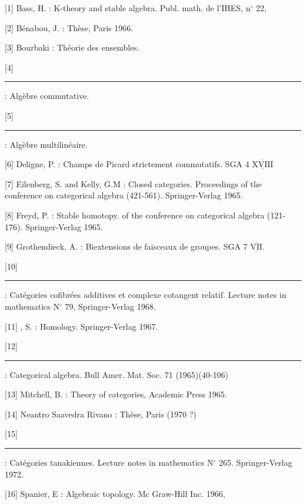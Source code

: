 [1] Bass, H. : K-theory and stable algebra. Publ. math. de l'IHES, n$^\circ$ 22,

[2] Bénabou, J. : Thèse, Paris 1966.

[3] Bourbaki : Théorie des ensembles.

[4] \rule[.25ex]{3em}{.45pt} : Algèbre commutative.

[5] \rule[.25ex]{3em}{.45pt} : Algèbre multilinéaire.

[6] Deligne, P. : Champs de Picard strictement commutatifs. SGA 4 $\overline{\underline{\mathrm{XVIII}}}$

[7] Eilenberg, S. and Kelly, G.M : Closed categories. Proceedings of the conference on categorical algebra (421-561). Springer-Verlag 1965.

[8] Freyd, P. : Stable homotopy.  of the conference on categorical algebra (121-176). Springer-Verlag 1965.

[9] Grothendieck, A. : Biextensions de faisceaux de groupes. SGA 7 $\overline{\underline{\mathrm{VII}}}$.

[10] \rule[.25ex]{2.2em}{.45pt} : Catégories cofibrées additives et complexe cotangent relatif. Lecture notes in mathematics N$^\circ$ 79, Springer-Verlag 1968.

[11] , S. : Homology. Springer-Verlag 1967.

[12] \rule[.25ex]{2.3em}{.45pt} : Categorical algebra. Bull Amer. Mat. Soc. 71 (1965)(40-106)

[13] Mitchell, B. : Theory of categories, Academic Press 1965.

[14] Neantro Saavedra Rivano : Thèse, Paris (1970 ?)

[15] \rule[.25ex]{2em}{.45pt} : Catégories tanakiennes. Lecture notes in mathematics N$^\circ$ 265. Springer-Verlag 1972.

[16] Spanier, E : Algebraic topology. Mc Graw-Hill Inc. 1966,
